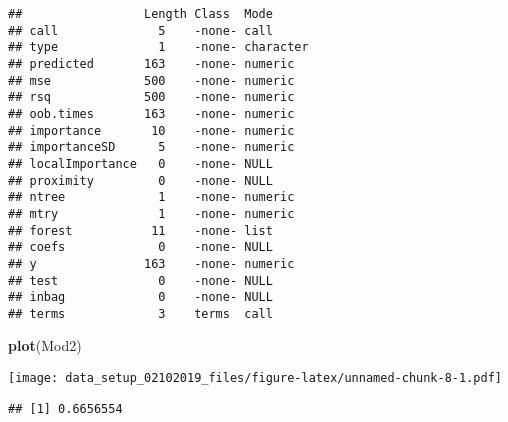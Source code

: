 \documentclass[]{article}
\newenvironment{Shaded}{\begin{snugshade}}{\end{snugshade}}
\newcommand{\KeywordTok}[1]{\textcolor[rgb]{0.13,0.29,0.53}{\textbf{{#1}}}}
\newcommand{\DataTypeTok}[1]{\textcolor[rgb]{0.13,0.29,0.53}{{#1}}}
\newcommand{\DecValTok}[1]{\textcolor[rgb]{0.00,0.00,0.81}{{#1}}}
\newcommand{\FloatTok}[1]{\textcolor[rgb]{0.00,0.00,0.81}{{#1}}}
\newcommand{\StringTok}[1]{\textcolor[rgb]{0.31,0.60,0.02}{{#1}}}
\newcommand{\CommentTok}[1]{\textcolor[rgb]{0.56,0.35,0.01}{\textit{{#1}}}}
\newcommand{\OtherTok}[1]{\textcolor[rgb]{0.56,0.35,0.01}{{#1}}}
\newcommand{\NormalTok}[1]{{#1}}
\begin{document}
\begin{verbatim}
##                 Length Class  Mode     
## call              5    -none- call     
## type              1    -none- character
## predicted       163    -none- numeric  
## mse             500    -none- numeric  
## rsq             500    -none- numeric  
## oob.times       163    -none- numeric  
## importance       10    -none- numeric  
## importanceSD      5    -none- numeric  
## localImportance   0    -none- NULL     
## proximity         0    -none- NULL     
## ntree             1    -none- numeric  
## mtry              1    -none- numeric  
## forest           11    -none- list     
## coefs             0    -none- NULL     
## y               163    -none- numeric  
## test              0    -none- NULL     
## inbag             0    -none- NULL     
## terms             3    terms  call
\end{verbatim}

\begin{Shaded}
\begin{Highlighting}[]
\KeywordTok{plot}\NormalTok{(Mod2)}
\end{Highlighting}
\end{Shaded}

\texttt{[image: data\_setup\_02102019\_files/figure-latex/unnamed-chunk-8-1.pdf]}

\begin{Shaded}
\end{Shaded}

\begin{verbatim}
## [1] 0.6656554
\end{verbatim}

\begin{Shaded}
\end{Shaded}
\end{document}

